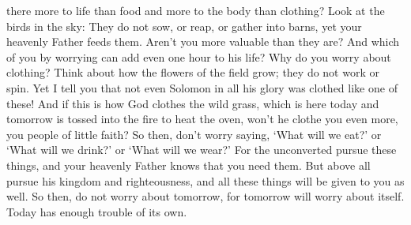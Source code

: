 {there more to life
than
food
and
more to the body
than clothing?
Look at
the birds
in the sky: They do
not
sow,
or
reap,
or
gather
into
barns,
yet
your
heavenly
Father
feeds
them.
Aren’t
you
more
valuable
than they are?
And
which
of
you
by worrying
can
add
even one
hour
to
his
life?
Why
do you worry
about
clothing? Think
about how the flowers
of the field
grow;
they do
not
work
or
spin.
Yet
I tell
you
that
not even
Solomon
in
all
his
glory
was clothed
like
one
of these!
And
if
this is how God clothes the wild grass,
which is
here today
and
tomorrow
is tossed
into
the fire
to heat the oven, won’t
he clothe
you even more,
you
people of little faith?
So
then, don’t
worry
saying,
‘What
will we eat?’ or
‘What
will we drink?’ or
‘What
will we wear?’
For
the unconverted
pursue
these things,
and your
heavenly
Father
knows
that
you need
them.
But
above all
pursue
his kingdom
and
righteousness,
and
all
these things
will be given
to you as well.
So then,
do
not
worry
about
tomorrow,
for
tomorrow
will worry
about itself.
Today
has enough
trouble
of its own.

}

